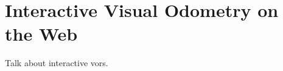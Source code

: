 \chapter{Interactive Visual Odometry on the Web}%
\label{cha:interactive_vo_on_the_web}

Talk about interactive vors.
